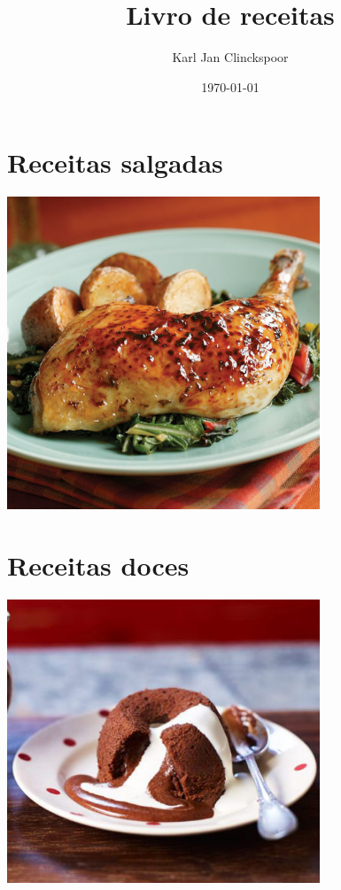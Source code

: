 \documentclass{book} \usepackage[utf8]{inputenc} \usepackage[brazil]{babel}
\title{Livro de receitas} \author{Karl Jan Clinckspoor} \date{\today}
\begin{document}
\maketitle
\tableofcontents

\chapter{Receitas salgadas}
\begin{center}
	\includegraphics[width=0.7\textwidth]{./Fotos/foto_savory}\end{center}
\clearpage


\chapter{Receitas doces}
\begin{center}
	\includegraphics[width=0.7\textwidth]{Fotos/foto_sweet} \end{center}
\clearpage


\end{document}
